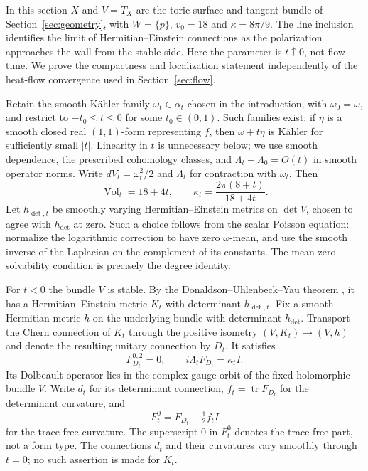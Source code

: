 \documentclass[11pt]{amsart}
\theoremstyle{definition}
\theoremstyle{remark}
\newcommand{\tr}{\operatorname{tr}}
\newcommand{\Vol}{\operatorname{Vol}}
\begin{document}
In this section $X$ and $V=T_X$ are the toric surface and tangent
bundle of Section~\ref{sec:geometry}, with $W=\{p\}$, $v_0=18$ and
$\kappa=8\pi/9$. The line inclusion identifies the limit of Hermitian--Einstein
connections as the polarization approaches the wall from the stable side.
Here the parameter is $t\uparrow0$, not flow time. We prove the compactness
and localization statement independently of the heat-flow convergence
used in Section~\ref{sec:flow}.

Retain the smooth K\"ahler family $\omega_t\in\alpha_t$ chosen in the
introduction, with $\omega_0=\omega$, and restrict to $-t_0\le t\le0$
for some $t_0\in(0,1)$. Such families exist: if $\eta$ is a smooth closed
real $(1,1)$-form representing $f$, then $\omega+t\eta$ is K\"ahler
for sufficiently small $|t|$. Linearity in $t$ is unnecessary below;
we use smooth dependence, the prescribed cohomology classes, and
$\Lambda_t-\Lambda_0=O(t)$ in smooth operator norms.
Write $dV_t=\omega_t^2/2$ and $\Lambda_t$ for contraction with
$\omega_t$. Then
\begin{equation}\label{eq:kappa-t}
 \Vol_t=18+4t,\qquad
 \kappa_t=\frac{2\pi(8+t)}{18+4t}.
\end{equation}
Let $h_{\det,t}$ be smoothly varying Hermitian--Einstein metrics on
$\det V$, chosen to agree with $h_{\det}$ at zero. Such a choice follows
from the scalar Poisson equation: normalize the logarithmic correction
to have zero $\omega$-mean, and use the smooth inverse of the Laplacian
on the complement of its constants. The mean-zero solvability condition
is precisely the degree identity.

For $t<0$ the bundle $V$ is stable. By the
Donaldson--Uhlenbeck--Yau theorem \cite{donaldson1985,uhlenbeckyau1986},
it has a Hermitian--Einstein metric $K_t$ with determinant $h_{\det,t}$.
Fix a smooth Hermitian metric $h$ on the underlying bundle with determinant
$h_{\det}$. Transport the Chern connection of $K_t$ through the positive
isometry $(V,K_t)\to(V,h)$ and denote the resulting unitary connection by
$D_t$. It satisfies
\begin{equation}\label{eq:he-t}
 F_{D_t}^{0,2}=0,
 \qquad i\Lambda_tF_{D_t}=\kappa_t I.
\end{equation}
Its Dolbeault operator lies in the complex gauge orbit of the fixed
holomorphic bundle $V$. Write $d_t$ for its determinant connection,
$f_t=\tr F_{D_t}$ for the determinant curvature, and
\begin{equation}\label{eq:trace-free}
 F_t^0=F_{D_t}-\tfrac12 f_t I
\end{equation}
for the trace-free curvature. The superscript $0$ in $F_t^0$ denotes the
trace-free part, not a form type. The connections $d_t$ and their curvatures
vary smoothly through $t=0$; no such assertion is made for $K_t$.
\end{document}

